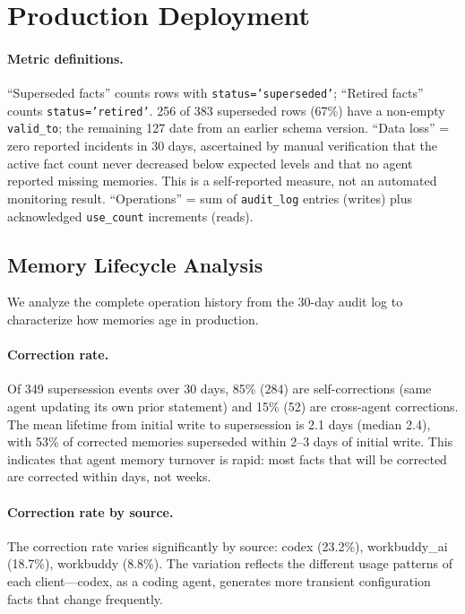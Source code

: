 \documentclass{article}
\begin{document}
\section{Production Deployment}
\label{sec:production}



\paragraph{Metric definitions.}
``Superseded facts'' counts rows with \texttt{status='superseded'}; ``Retired facts'' counts \texttt{status='retired'}. 256 of 383 superseded rows (67\%) have a non-empty \texttt{valid\_to}; the remaining 127 date from an earlier schema version. ``Data loss'' = zero reported incidents in 30 days, ascertained by manual verification that the active fact count never decreased below expected levels and that no agent reported missing memories. This is a self-reported measure, not an automated monitoring result. ``Operations'' = sum of \texttt{audit\_log} entries (writes) plus acknowledged \texttt{use\_count} increments (reads).


\subsection{Memory Lifecycle Analysis}
\label{sec:lifecycle}

We analyze the complete operation history from the 30-day audit log to characterize how memories age in production.

\paragraph{Correction rate.} Of 349 supersession events over 30 days, 85\% (284) are self-corrections (same agent updating its own prior statement) and 15\% (52) are cross-agent corrections. The mean lifetime from initial write to supersession is 2.1 days (median 2.4), with 53\% of corrected memories superseded within 2--3 days of initial write. This indicates that agent memory turnover is rapid: most facts that will be corrected are corrected within days, not weeks.

\paragraph{Correction rate by source.} The correction rate varies significantly by source: codex (23.2\%), workbuddy\_ai (18.7\%), workbuddy (8.8\%). The variation reflects the different usage patterns of each client---codex, as a coding agent, generates more transient configuration facts that change frequently.
\end{document}
